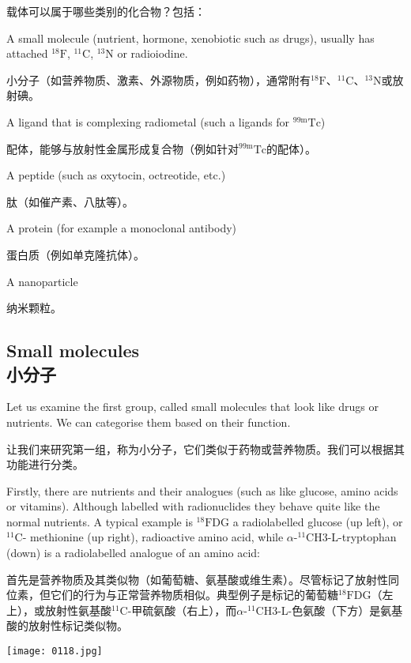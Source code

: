 \documentclass[dvipsnames, svgnames,a4paper,11pt]{article}
\begin{document}
载体可以属于哪些类别的化合物？包括：

A small molecule (nutrient, hormone, xenobiotic such as drugs), usually has
attached ${}^{18}\mathrm{F}$, ${}^{11}\mathrm{C}$, ${}^{13}\mathrm{N}$ or radioiodine.

小分子（如营养物质、激素、外源物质，例如药物），通常附有${}^{18}\mathrm{F}$、${}^{11}\mathrm{C}$、${}^{13}\mathrm{N}$或放射碘。

A ligand that is complexing radiometal (such a ligands for ${}^\mathrm{99m}\mathrm{Tc}$)

配体，能够与放射性金属形成复合物（例如针对${}^\mathrm{99m}\mathrm{Tc}$的配体）。

A peptide (such as oxytocin, octreotide, etc.)

肽（如催产素、八肽等）。

A protein (for example a monoclonal antibody)

蛋白质（例如单克隆抗体）。

A nanoparticle

纳米颗粒。

\subsection{Small molecules \\小分子}


Let us examine the first group, called small molecules that look like drugs or
nutrients. We can categorise them based on their function.

让我们来研究第一组，称为小分子，它们类似于药物或营养物质。我们可以根据其功能进行分类。


Firstly, there are nutrients and their analogues (such as like glucose, amino acids or
vitamins). Although labelled with radionuclides they behave quite like the normal
nutrients. A typical example is ${}^{18}\mathrm{F}$DG a radiolabelled glucose (up left), or ${}^{11}\mathrm{C}$-
methionine (up right), radioactive amino acid, while $\alpha$-${}^{11}\mathrm{C}$H3-L-tryptophan (down) is a
radiolabelled analogue of an amino acid:

首先是营养物质及其类似物（如葡萄糖、氨基酸或维生素）。尽管标记了放射性同位素，但它们的行为与正常营养物质相似。典型例子是标记的葡萄糖${}^{18}\mathrm{F}$DG（左上），或放射性氨基酸${}^{11}\mathrm{C}$-甲硫氨酸（右上），而$\alpha$-${}^{11}\mathrm{C}$H3-L-色氨酸（下方）是氨基酸的放射性标记类似物。

\begin{figure*}[h]
	\centering
    \texttt{[image: 0118.jpg]}
\end{figure*}
\end{document}
